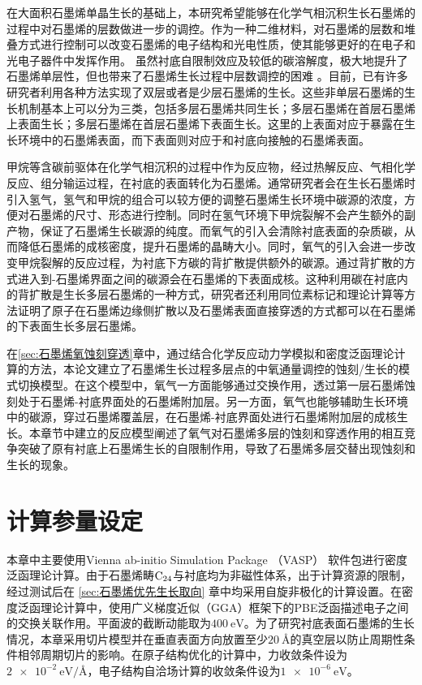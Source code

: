 在大面积石墨烯单晶生长的基础上，本研究希望能够在化学气相沉积生长石墨烯的过程中对石墨烯的层数做进一步的调控。作为一种二维材料，对石墨烯的层数和堆叠方式进行控制可以改变石墨烯的电子结构和光电性质，使其能够更好的在电子和光电子器件中发挥作用。
虽然衬底自限制效应及较低的碳溶解度，极大地提升了石墨烯单层性，但也带来了石墨烯生长过程中层数调控的困难 。目前，已有许多研究者利用各种方法实现了双层或者是少层石墨烯的生长。这些非单层石墨烯的生长机制基本上可以分为三类，包括多层石墨烯共同生长；多层石墨烯在首层石墨烯上表面生长；多层石墨烯在首层石墨烯下表面生长。这里的上表面对应于暴露在生长环境中的石墨烯表面，而下表面则对应于和衬底向接触的石墨烯表面。

甲烷等含碳前驱体在化学气相沉积的过程中作为反应物，经过热解反应、气相化学反应、组分输运过程，在衬底的表面转化为石墨烯。通常研究者会在生长石墨烯时引入氢气，氢气和甲烷的组合可以较方便的调整石墨烯生长环境中碳源的浓度，方便对石墨烯的尺寸、形态进行控制。同时在氢气环境下甲烷裂解不会产生额外的副产物，保证了石墨烯生长碳源的纯度。而氧气的引入会清除衬底表面的杂质碳，从而降低石墨烯的成核密度，提升石墨烯的晶畴大小。同时，氧气的引入会进一步改变甲烷裂解的反应过程，为衬底下方碳的背扩散提供额外的碳源。通过背扩散的方式进入到-石墨烯界面之间的碳源会在石墨烯的下表面成核。这种利用碳在衬底内的背扩散是生长多层石墨烯的一种方式，研究者还利用同位素标记和理论计算等方法证明了原子在石墨烯边缘侧扩散以及石墨烯表面直接穿透的方式都可以在石墨烯的下表面生长多层石墨烯。

在\ref{sec:石墨烯氧蚀刻穿透}章中，通过结合化学反应动力学模拟和密度泛函理论计算的方法，本论文建立了石墨烯生长过程多层点的中氧通量调控的蚀刻/生长的模式切换模型。在这个模型中，氧气一方面能够通过交换作用，透过第一层石墨烯蚀刻处于石墨烯-衬底界面处的石墨烯附加层。另一方面，氧气也能够辅助生长环境中的碳源，穿过石墨烯覆盖层，在石墨烯-衬底界面处进行石墨烯附加层的成核生长。本章节中建立的反应模型阐述了氧气对石墨烯多层的蚀刻和穿透作用的相互竞争突破了原有衬底上石墨烯生长的自限制作用，导致了石墨烯多层交替出现蚀刻和生长的现象。

\section{计算参量设定}

本章中主要使用Vienna ab-initio Simulation Package （VASP） 软件包进行密度泛函理论计算。由于石墨烯畴$\rm{C_{24}}$与衬底均为非磁性体系，出于计算资源的限制，经过测试后在 \ref{sec:石墨烯优先生长取向} 章中均采用自旋非极化的计算设置。在密度泛函理论计算中，使用广义梯度近似（GGA）框架下的PBE泛函描述电子之间的交换关联作用。平面波的截断动能取为$\SI{400}{\electronvolt}$。为了研究衬底表面石墨烯的生长情况，本章采用切片模型并在垂直表面方向放置至少$\SI{20}{\angstrom}$的真空层以防止周期性条件相邻周期切片的影响。在原子结构优化的计算中，力收敛条件设为$\SI{2e-2}{\electronvolt \per \angstrom}$，电子结构自洽场计算的收敛条件设为$\SI{1e-6}{\electronvolt}$。

